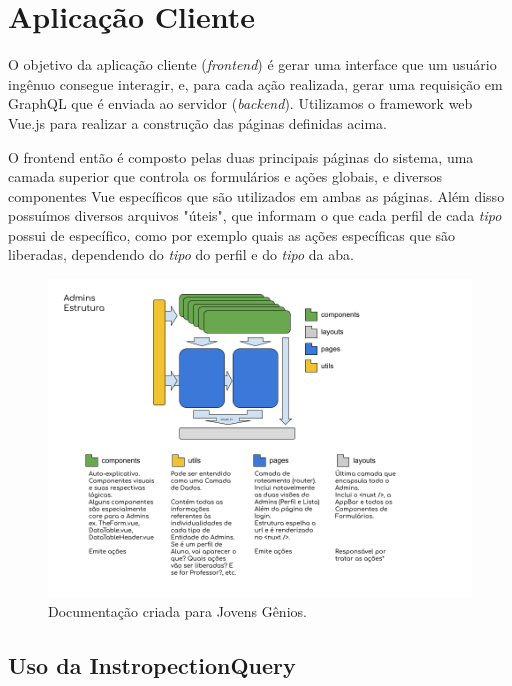 \section{Aplicação Cliente}

O objetivo da aplicação cliente (\textit{frontend}) é gerar uma interface que um usuário ingênuo consegue interagir, e, para cada ação realizada, gerar uma requisição em GraphQL que é enviada ao servidor (\textit{backend}). Utilizamos o framework web Vue.js para realizar a construção das páginas definidas acima.

O frontend então é composto pelas duas principais páginas do sistema, uma camada superior que controla os formulários e ações globais, e diversos componentes Vue específicos que são utilizados em ambas as páginas. Além disso possuímos diversos arquivos "úteis", que informam o que cada perfil de cada \textit{tipo} possui de específico, como por exemplo quais as ações específicas que são liberadas, dependendo do \textit{tipo} do perfil e do \textit{tipo} da aba.

\begin{figure}[H]
    \centering
    \includegraphics[width=1.0\linewidth]{Imagens/chap04/front-estrutura.png}
    \caption{Documentação criada para Jovens Gênios.}
    \label{fig:profile-exemple}
\end{figure}

\subsection{Uso da InstropectionQuery}

